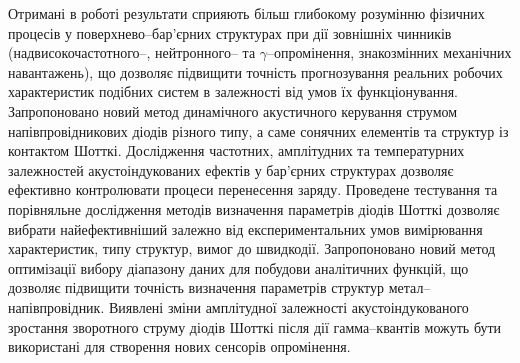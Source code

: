 {\influenceTXT}
Отримані в роботі результати сприяють більш глибокому розумінню фізичних процесів у поверхнево--бар'єрних структурах при дії зовнішніх чинників
(надвисокочастотного--, нейтронного-- та $\gamma$--опромінення, знакозмінних механічних навантажень), що
дозволяє підвищити точність прогнозування реальних робочих характеристик подібних систем в залежності від умов їх функціонування.
Запропоновано новий метод динамічного акустичного керування струмом напівпровідникових діодів різного типу, а саме сонячних елементів та структур із контактом Шотткі.
Дослідження частотних, амплітудних та температурних залежностей акустоіндукованих ефектів у бар'єрних структурах дозволяє
ефективно контролювати процеси перенесення заряду.
Проведене тестування та порівняльне дослідження методів визначення параметрів діодів Шотткі дозволяє вибрати найефективніший залежно
від експериментальних умов вимірювання характеристик, типу структур, вимог до швидкодії.
Запропоновано новий метод оптимізації вибору діапазону даних для побудови аналітичних функцій, що дозволяє підвищити точність визначення параметрів структур метал--напівпровідник.
Виявлені зміни амплітудної залежності акустоіндукованого зростання зворотного струму  діодів Шотткі
 після дії гамма--квантів
можуть бути використані для створення нових сенсорів опромінення.




